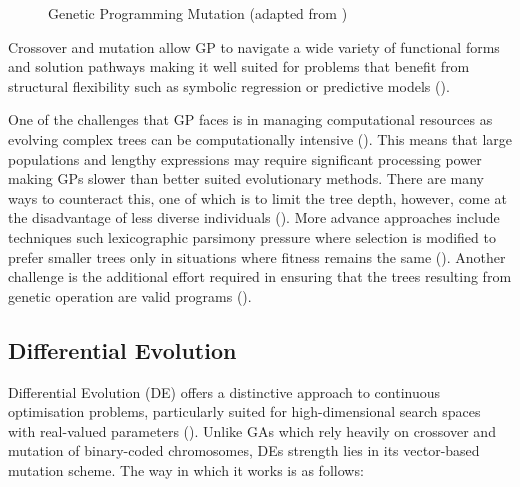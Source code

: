 \begin{figure}[H] %
	\centering %
	\caption{Genetic Programming Mutation (adapted from \cite{book_introduction_to_evolutionary_computing})}
	\label{fig:gp_mutation} %
\end{figure}

\noindent Crossover and mutation allow GP to navigate a wide variety of functional forms and solution pathways making it well suited for problems that benefit from structural flexibility such as symbolic regression or predictive models (\cite{back2012handbook}). \bigskip

\noindent One of the challenges that GP faces is in managing computational resources as evolving complex trees can be computationally intensive (\cite{koza1994genetic}). This means that large populations and lengthy expressions may require significant processing power making GPs slower than better suited evolutionary methods. There are many ways to counteract this, one of which is to limit the tree depth, however, come at the disadvantage of less diverse individuals (\cite{koza1994genetic}). More advance approaches include techniques such lexicographic parsimony pressure where selection is modified to prefer smaller trees only in situations where fitness remains the same (\cite{luke2002lexicographic}). Another challenge is the additional effort required in ensuring that the trees resulting from genetic operation are valid programs (\cite{koza1994genetic}).

\subsection{Differential Evolution}
Differential Evolution (DE) offers a distinctive approach to continuous optimisation problems, particularly suited for high-dimensional search spaces with real-valued parameters (\cite{storn1995differential}). Unlike GAs which rely heavily on crossover and mutation of binary-coded chromosomes, DEs strength lies in its vector-based mutation scheme. The way in which it works is as follows:

